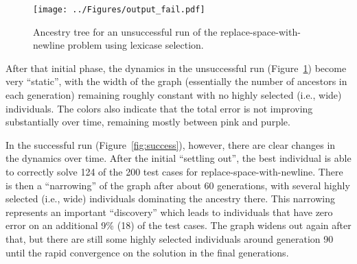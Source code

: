 \documentclass{sig-alternate}
\begin{document}
\begin{figure}[p]
\centering
\texttt{[image: ../Figures/output\_fail.pdf]}
\caption{Ancestry tree for an unsuccessful run of the replace-space-with-newline problem using lexicase selection. }
\label{fig:fail}
\end{figure}



After that initial phase, the dynamics in the unsuccessful run (Figure~\ref{fig:fail}) become very ``static'', with the width of the graph (essentially the number of ancestors in each generation) remaining roughly constant with no highly selected (i.e., wide) individuals. The colors also indicate that the total error is not improving substantially over time, remaining mostly between pink and purple.

In the successful run (Figure~\ref{fig:success}), however, there are clear changes in the dynamics over time. After the initial ``settling out'', the best individual is able to correctly solve 124 of the 200 test cases for replace-space-with-newline. There is then a ``narrowing'' of the graph after about 60 generations, with several highly selected (i.e., wide) individuals dominating the ancestry there. This narrowing represents an important ``discovery'' which leads to individuals that have zero error on an additional 9\% (18) of the test cases. The graph widens out again after that, but there are still some highly selected individuals around generation 90 until the rapid convergence on the solution in the final generations.






\end{document}
